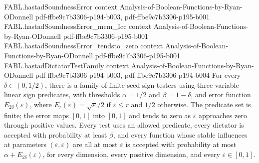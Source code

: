 \begin{theorem}
\proofstep
  {FABL.hastadSoundnessError}
  {context}
  {Analysis-of-Boolean-Functions-by-Ryan-ODonnell}
  {pdf-ffbe9c7b3306-p194-b003,
    pdf-ffbe9c7b3306-p195-b001}
\proofstep
  {FABL.hastadSoundnessError_mem_Icc}
  {context}
  {Analysis-of-Boolean-Functions-by-Ryan-ODonnell}
  {pdf-ffbe9c7b3306-p195-b001}
\proofstep
  {FABL.hastadSoundnessError_tendsto_zero}
  {context}
  {Analysis-of-Boolean-Functions-by-Ryan-ODonnell}
  {pdf-ffbe9c7b3306-p195-b001}
\proofstep
  {FABL.hastadDictatorTestFamily}
  {context}
  {Analysis-of-Boolean-Functions-by-Ryan-ODonnell}
  {pdf-ffbe9c7b3306-p194-b003,
    pdf-ffbe9c7b3306-p194-b004}
For every $\delta\in(0,1/2)$, there is a family of finite-seed sign testers using
three-variable linear sign predicates, with thresholds $\alpha=1/2$ and
$\beta=1-\delta$, and error function $E_{2\delta}(\varepsilon)$, where
$E_r(\varepsilon)=\sqrt{\varepsilon}/2$ if $\varepsilon\le r$ and $1/2$ otherwise. The
predicate set is finite; the error maps $[0,1]$ into $[0,1]$ and tends to zero as
$\varepsilon$ approaches zero through positive values. Every test uses an allowed
predicate, every dictator is accepted with probability at least $\beta$, and every
function whose stable influences at parameters $(\varepsilon,\varepsilon)$ are all at
most $\varepsilon$ is accepted with probability at most
$\alpha+E_{2\delta}(\varepsilon)$, for every dimension, every positive dimension, and
every $\varepsilon\in[0,1]$.
\end{theorem}
